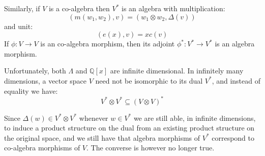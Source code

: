 \documentclass[12pt,dvips]{amsart}
\begin{document}
\bigskip
\noindent
Similarly, if $V$ is a co-algebra then $V^*$ is an algebra with multiplication: 
$$ ( m(w_1, w_2), v ) = ( w_1 \otimes w_2, \Delta(v) ) $$
and unit:
$$ (e(x), v) = x c(v)  $$
If $\phi : V \to V$ is an co-algebra morphism, then its adjoint $\phi^* : V^* \to V^*$ is an algebra morphism.

\par\bigskip
Unfortunately, both $\Lambda$ and $\mathbb{Q}[x]$ are infinite dimensional. In infinitely many dimensions, a vector space $V$ need not be isomorphic to its dual $V^*$, and instead of equality we have:
$$ V^* \otimes V^* \subseteq (V \otimes V)^* $$

Since $\Delta(w) \in V^* \otimes V^*$ whenever $w \in V^*$ we are still able, in infinite dimensions, to induce a product structure on the dual from an existing product structure on the original space, and we still have that algebra morphisms of $V^*$ correspond to co-algebra morphisms of $V$. The converse is however no longer true. 




\end{document}
